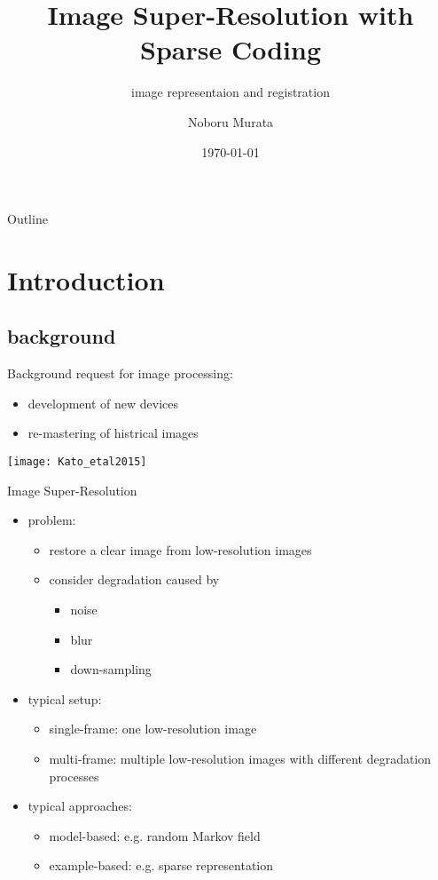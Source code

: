\documentclass[fleqn,aspectratio=1610]{beamer}
\author{Noboru Murata}
\date{\today}
\title{Image Super-Resolution with Sparse Coding}
\subtitle{image representaion and registration}
\institute{\url{https://noboru-murata.github.io/}}
\begin{document}
\maketitle
\begin{frame}{Outline}
\tableofcontents
\end{frame}


\section{Introduction}
\label{sec:org808e638}
\subsection{background}
\label{sec:org01d85fc}
\begin{frame}[label={sec:org1cbfcbf}]{Background}
request for image processing:
\begin{itemize}
\item development of new devices
\item re-mastering of histrical images
\end{itemize}
\begin{center}
\texttt{[image: Kato\_etal2015]}
\end{center}
\end{frame}

\begin{frame}[label={sec:org49b9069}]{Image Super-Resolution}
\begin{itemize}
\item problem:
\begin{itemize}
\item restore a clear image from low-resolution images
\item consider degradation caused by
\begin{itemize}
\item noise
\item blur
\item down-sampling
\end{itemize}
\end{itemize}
\item typical setup:
\begin{itemize}
\item single-frame: one low-resolution image
\item \alert{multi-frame}: 
multiple low-resolution images with different degradation
processes
\end{itemize}
\item typical approaches:
\begin{itemize}
\item model-based: e.g. random Markov field
\item \alert{example-based}: e.g. sparse representation
\end{itemize}
\end{itemize}
\end{frame}
\end{document}
